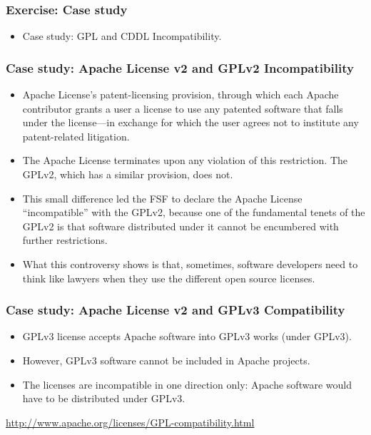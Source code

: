 
\begin{frame}
\frametitle{Exercise: Case study}


\begin{itemize}
\item Case study: GPL and CDDL Incompatibility.
\end{itemize}

\end{frame}


\begin{frame}
\frametitle{Case study: Apache License v2 and GPLv2 Incompatibility}


\begin{itemize}
\item Apache License’s patent-licensing provision, through which each Apache contributor grants a user a license to use any patented software that falls under the license—in exchange for which the user agrees not to institute any patent-related litigation. 
\item The Apache License terminates upon any violation of this restriction. The GPLv2, which has a similar provision, does not.
\item This small difference led the FSF to declare the Apache License ``incompatible'' with the GPLv2, because one of the fundamental tenets of the GPLv2 is that software distributed under it cannot be encumbered with further restrictions. 
\item What this controversy shows is that, sometimes, software developers need to think like lawyers when they use the different open source licenses. 
\end{itemize}

\end{frame}


\begin{frame}
\frametitle{Case study: Apache License v2 and GPLv3 Compatibility}


\begin{itemize}
\item GPLv3 license accepts Apache software into GPLv3 works (under GPLv3).
\item However, GPLv3 software cannot be included in Apache projects. 
\item The licenses are incompatible in one direction only: Apache software would have to be distributed under GPLv3.
\end{itemize}

\url{http://www.apache.org/licenses/GPL-compatibility.html}

\end{frame}




